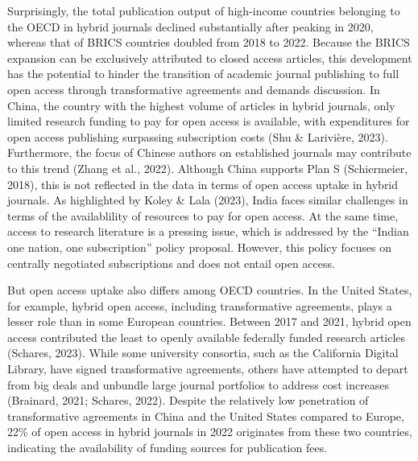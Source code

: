 \documentclass[a4paper,man,floatsintext,longtable,noextraspace,12pt]{apa6}
\begin{document}
Surprisingly, the total publication output of high-income countries
belonging to the OECD in hybrid journals declined substantially after
peaking in 2020, whereas that of BRICS countries doubled from 2018 to
2022. Because the BRICS expansion can be exclusively attributed to
closed access articles, this development has the potential to hinder the
transition of academic journal publishing to full open access through
transformative agreements and demands discussion. In China, the country
with the highest volume of articles in hybrid journals, only limited
research funding to pay for open access is available, with expenditures
for open access publishing surpassing subscription costs (Shu \&
Larivière, 2023). Furthermore, the focus of Chinese authors on
established journals may contribute to this trend (Zhang et al., 2022).
Although China supports Plan S (Schiermeier, 2018), this is not
reflected in the data in terms of open access uptake in hybrid journals.
As highlighted by Koley \& Lala (2023), India faces similar challenges
in terms of the availablility of resources to pay for open access. At
the same time, access to research literature is a pressing issue, which
is addressed by the ``Indian one nation, one subscription'' policy
proposal. However, this policy focuses on centrally negotiated
subscriptions and does not entail open access.

But open access uptake also differs among OECD countries. In the United
States, for example, hybrid open access, including transformative
agreements, plays a lesser role than in some European countries. Between
2017 and 2021, hybrid open access contributed the least to openly
available federally funded research articles (Schares, 2023). While some
university consortia, such as the California Digital Library, have
signed transformative agreements, others have attempted to depart from
big deals and unbundle large journal portfolios to address cost
increases (Brainard, 2021; Schares, 2022). Despite the relatively low
penetration of transformative agreements in China and the United States
compared to Europe, 22\% of open access in hybrid journals in 2022
originates from these two countries, indicating the availability of
funding sources for publication fees.
\end{document}
